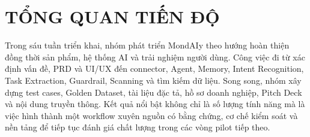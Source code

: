 \documentclass[12pt,a4paper]{article}
\begin{document}
\section{TỔNG QUAN TIẾN ĐỘ}

Trong sáu tuần triển khai, nhóm phát triển MondAIy theo hướng hoàn thiện đồng thời
sản phẩm, hệ thống AI và trải nghiệm người dùng. Công việc đi từ xác định vấn đề,
PRD và UI/UX đến connector, Agent, Memory, Intent Recognition, Task Extraction,
Guardrail, Scanning và tìm kiếm dữ liệu. Song song, nhóm xây dựng test cases,
Golden Dataset, tài liệu đặc tả, hồ sơ doanh nghiệp, Pitch Deck và nội dung truyền
thông. Kết quả nổi bật không chỉ là số lượng tính năng mà là việc hình thành một
workflow xuyên nguồn có bằng chứng, cơ chế kiểm soát và nền tảng để tiếp tục đánh
giá chất lượng trong các vòng pilot tiếp theo.
\end{document}
